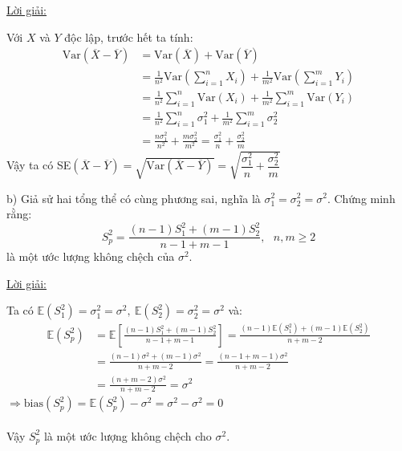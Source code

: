 \documentclass[10pt, a4paper]{article}
\begin{document}
\begin{center}
	\color{blue}\underline{Lời giải:}
\end{center}
Với $X$ và $Y$ độc lập, trước hết ta tính: \begin{align*}
	\text{Var}(\overline X-\overline Y)&=\text{Var}(\overline X)+\text{Var}(\overline Y)\\
	&=\frac{1}{n^2}\text{Var}\left(\sum_{i=1}^nX_i\right)+\frac{1}{m^2}\text{Var}\left(\sum_{i=1}^mY_i\right)\\
	&=\frac{1}{n^2}\sum_{i=1}^n\text{Var}(X_i)+\frac{1}{m^2}\sum_{i=1}^m\text{Var}(Y_i)\\
	&=\frac{1}{n^2}\sum_{i=1}^n\sigma_1^2+\frac{1}{m^2}\sum_{i=1}^m\sigma_2^2\\
	&=\frac{n\sigma_1^2}{n^2}+\frac{m\sigma_2^2}{m^2}=\frac{\sigma_1^2}{n}+\frac{\sigma_2^2}{m}
\end{align*}
Vậy ta có SE$(\overline X-\overline Y)=\sqrt{\text{Var}(\overline X-\overline Y)}=\sqrt{\dfrac{\sigma_1^2}{n}+\dfrac{\sigma_2^2}{m}}$
\vspace{3mm}
\begin{tcolorbox}[enhanced,colback=blue!5!white,colframe=blue!75!black,sharp corners=all,shadow={0mm}{0mm}{-1.5mm}%
{fill=blue!75!red,opacity=0.3}]
\color{red}b) \color{black}Giả sử hai tổng thể có cùng phương sai, nghĩa là $\sigma_1^2=\sigma_2^2=\sigma^2$. Chứng minh rằng: $$S_p^2=\dfrac{(n-1)S_1^2+(m-1)S_2^2}{n-1+m-1},~~~n,m\ge2$$
là một ước lượng không chệch của $\sigma^2$.
\end{tcolorbox}
\begin{center}
	\color{blue}\underline{Lời giải:}
\end{center}
Ta có $\mathbb E(S_1^2)=\sigma_1^2=\sigma^2,~\mathbb E(S_2^2)=\sigma_2^2=\sigma^2$ và: \begin{align*}
	\mathbb E(S_p^2)&=\mathbb E\left[\frac{(n-1)S_1^2+(m-1)S_2^2}{n-1+m-1}\right]=\frac{(n-1)\mathbb E(S_1^2)+(m-1)\mathbb E(S_2^2)}{n+m-2}\\
	&=\frac{(n-1)\sigma^2+(m-1)\sigma^2}{n+m-2}=\frac{(n-1+m-1)\sigma^2}{n+m-2}\\
	&=\frac{(n+m-2)\sigma^2}{n+m-2}=\sigma^2
\end{align*}
$\Rightarrow\text{bias}(S_p^2)=\mathbb E(S_p^2)-\sigma^2=\sigma^2-\sigma^2=0$\\\\
Vậy $S_p^2$ là một ước lượng không chệch cho $\sigma^2$.
\end{document}
